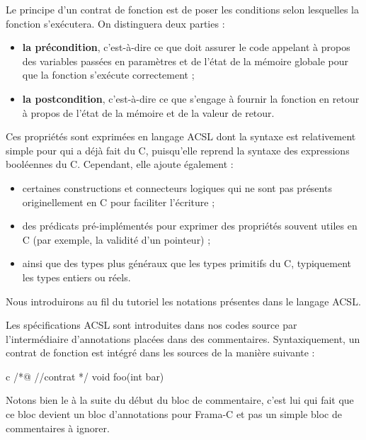 Le principe d'un contrat de fonction est de poser les conditions selon
lesquelles la fonction s'exécutera. On distinguera deux parties :
\begin{itemize}
\item \textbf{la précondition}, c'est-à-dire ce que doit assurer le code
      appelant à propos des variables passées en paramètres et de l'état de
      la mémoire globale pour que la fonction s'exécute correctement ;
\item \textbf{la postcondition}, c'est-à-dire ce que s'engage à fournir la
      fonction en retour à propos de l'état de la mémoire et de la valeur de
      retour.
\end{itemize}


Ces propriétés sont exprimées en langage ACSL dont la syntaxe est relativement
simple pour qui a déjà fait du C, puisqu'elle reprend la syntaxe des expressions
booléennes du C. Cependant, elle ajoute également :
\begin{itemize}
\item certaines constructions et connecteurs logiques qui ne sont pas présents
originellement en C pour faciliter l'écriture ;
\item des prédicats pré-implémentés pour exprimer des propriétés souvent utiles
en C (par exemple, la validité d'un pointeur) ;
\item ainsi que des types plus généraux que les types primitifs du C,
typiquement les types entiers ou réels.
\end{itemize}


Nous introduirons au fil du tutoriel les notations présentes dans le
langage ACSL.



Les spécifications ACSL sont introduites dans nos codes source par
l'intermédiaire d'annotations placées dans des commentaires. Syntaxiquement,
un contrat de fonction est intégré dans les sources de la manière suivante :



\begin{CodeBlock}{c}
/*@
  //contrat
*/
void foo(int bar){

}
\end{CodeBlock}



Notons bien le  à la suite du début du bloc de commentaire, c'est lui qui
fait que ce bloc devient un bloc d'annotations pour Frama-C et pas un simple
bloc de commentaires à ignorer.



